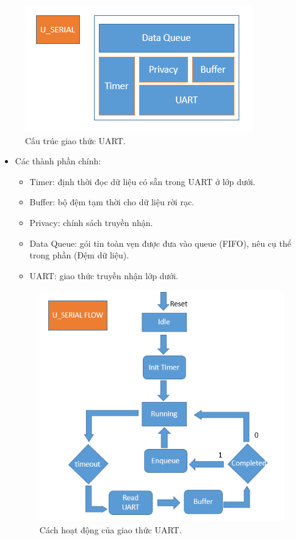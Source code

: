 \documentclass[a4paper,12pt,oneside]{article}
\begin{document}
\begin{itemize}
\begin{itemize}
			\begin{figure}[H]
				\centering
				\includegraphics[scale=1]{hinh/uart_protocol.PNG}
				\caption{Cấu trúc giao thức UART.}
			\end{figure}
			
		  \begin{itemize}
		  \item	Các thành phần chính:
		  	\begin{itemize}
		  		\item	Timer: định thời đọc dữ liệu có sẵn trong UART ở lớp dưới.
				\item	Buffer: bộ đệm tạm thời cho dữ liệu rời rạc.
				\item	Privacy: chính sách truyền nhận.
				\item	Data Queue: gói tin toàn vẹn được đưa vào queue (FIFO), nêu cụ thể trong phần (Đệm dữ liệu). 
				\item	UART: giao thức truyền nhận lớp dưới.
		  	\end{itemize}
		  	
		  	
			\begin{figure}[H]
				\centering
				\includegraphics[scale=.6]{hinh/uart_flow.PNG}
				\caption{Cách hoạt động của giao thức UART.}
			\end{figure}	  	
		  	
		  \end{itemize}
		\end{itemize}
	\end{itemize}
\end{document}
